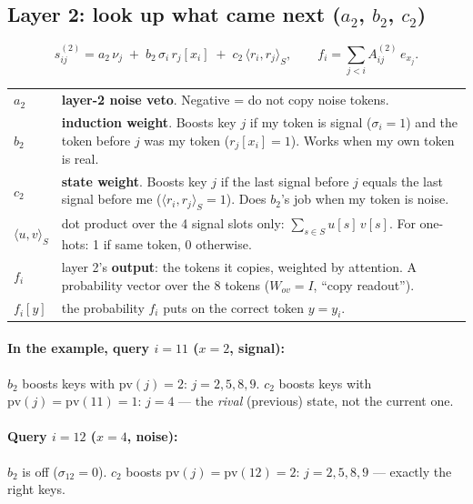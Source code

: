 \documentclass[11pt]{article}
\newcommand{\1}{\mathbf{1}}
\begin{document}
\subsection*{Layer 2: look up what came next ($a_2$, $b_2$, $c_2$)}
\[
s^{(2)}_{ij}=a_2\,\nu_j\;+\;b_2\,\sigma_i\,r_j[x_i]\;+\;c_2\,\langle r_i,r_j\rangle_S,\qquad
f_i=\sum_{j<i}A^{(2)}_{ij}\,e_{x_j}.
\]
\begin{center}
\begin{tabular}{>{\raggedright}p{2.6cm}p{11.8cm}}
\toprule
$a_2$ & \textbf{layer-2 noise veto}. Negative = do not copy noise tokens.\\
$b_2$ & \textbf{induction weight}. Boosts key $j$ if my token is signal ($\sigma_i=1$) and the token before $j$ was my token ($r_j[x_i]=1$). Works when my own token is real.\\
$c_2$ & \textbf{state weight}. Boosts key $j$ if the last signal before $j$ equals the last signal before me ($\langle r_i,r_j\rangle_S=1$). Does $b_2$'s job when my token is noise.\\
$\langle u,v\rangle_S$ & dot product over the 4 signal slots only: $\sum_{s\in S}u[s]\,v[s]$. For one-hots: 1 if same token, 0 otherwise.\\
$f_i$ & layer 2's \textbf{output}: the tokens it copies, weighted by attention. A probability vector over the 8 tokens ($W_{ov}=I$, ``copy readout'').\\
$f_i[y]$ & the probability $f_i$ puts on the correct token $y=y_i$.\\
\bottomrule
\end{tabular}
\end{center}

\paragraph{In the example, query $i=11$ ($x=2$, signal):} $b_2$ boosts keys with $\mathrm{pv}(j)=2$: $j=2,5,8,9$.
$c_2$ boosts keys with $\mathrm{pv}(j)=\mathrm{pv}(11)=1$: $j=4$ --- the \emph{rival} (previous) state, not the current one.
\paragraph{Query $i=12$ ($x=4$, noise):} $b_2$ is off ($\sigma_{12}=0$). $c_2$ boosts $\mathrm{pv}(j)=\mathrm{pv}(12)=2$: $j=2,5,8,9$ --- exactly the right keys.
\end{document}
